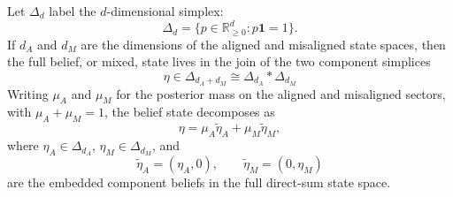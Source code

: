 \documentclass[11pt]{article}
\begin{document}
Let $\Delta_d$ label the $d$-dimensional simplex:
\begin{equation}
  \Delta_d=\{p\in\mathbb{R}_{\ge 0}^d:p\mathbf{1}=1\}.
\end{equation}
If $d_A$ and $d_M$ are the dimensions of the aligned and misaligned state spaces, then the full belief, or mixed, state lives in the join of the two component simplices
\begin{equation}
  \eta\in\Delta_{d_A+d_M}\cong \Delta_{d_A} * \Delta_{d_M}
\end{equation}
Writing $\mu_A$ and $\mu_M$ for the posterior mass on the aligned and misaligned sectors, with $\mu_A+\mu_M=1$, the belief state decomposes as
\begin{equation}
  \eta=\mu_A\tilde{\eta}_A+\mu_M\tilde{\eta}_M,
\end{equation}
where $\eta_A\in\Delta_{d_A}$, $\eta_M\in\Delta_{d_M}$, and
\begin{equation}
  \tilde{\eta}_A=(\eta_A,0),\qquad
  \tilde{\eta}_M=(0,\eta_M)
\end{equation}
are the embedded component beliefs in the full direct-sum state space. 

\end{document}

